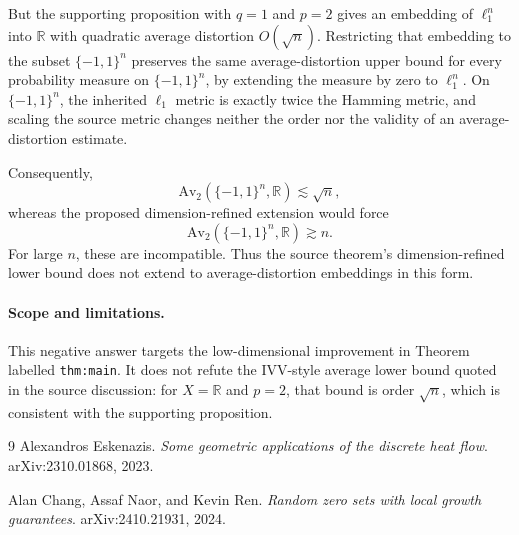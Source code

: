 \documentclass[11pt]{article}
\newcommand{\R}{\mathbb{R}}
\newcommand{\cH}{\{-1,1\}^n}
\begin{document}
But the supporting proposition with \(q=1\) and \(p=2\) gives an embedding of \(\ell_1^n\) into \(\R\) with quadratic average distortion \(O(\sqrt n)\).  Restricting that embedding to the subset \(\cH\) preserves the same average-distortion upper bound for every probability measure on \(\cH\), by extending the measure by zero to \(\ell_1^n\).  On \(\cH\), the inherited \(\ell_1\) metric is exactly twice the Hamming metric, and scaling the source metric changes neither the order nor the validity of an average-distortion estimate.

Consequently,
\[
  \mathrm{Av}_2(\cH,\R) \lesssim \sqrt n,
\]
whereas the proposed dimension-refined extension would force
\[
  \mathrm{Av}_2(\cH,\R) \gtrsim n.
\]
For large \(n\), these are incompatible.  Thus the source theorem's dimension-refined lower bound does not extend to average-distortion embeddings in this form.

\paragraph{Scope and limitations.}
This negative answer targets the low-dimensional improvement in Theorem labelled \texttt{thm:main}.  It does not refute the IVV-style average lower bound quoted in the source discussion: for \(X=\R\) and \(p=2\), that bound is order \(\sqrt n\), which is consistent with the supporting proposition.

\begin{thebibliography}{9}
Alexandros Eskenazis.
\newblock \emph{Some geometric applications of the discrete heat flow}.
\newblock arXiv:2310.01868, 2023.

Alan Chang, Assaf Naor, and Kevin Ren.
\newblock \emph{Random zero sets with local growth guarantees}.
\newblock arXiv:2410.21931, 2024.
\end{thebibliography}
\end{document}
